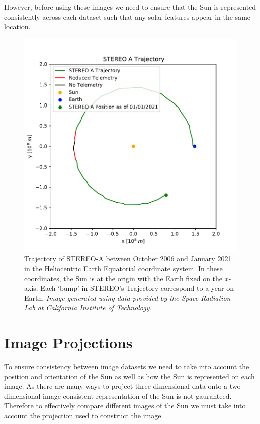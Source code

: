 \documentclass[11pt,a4paper,onecolumn]{report}
\begin{document}
However, before using these images we need to ensure that the Sun is represented
consistently across each dataset such that any solar features appear in the
same location.

\begin{figure}[ht]
  \centering
  \includegraphics[width = 0.7\linewidth]{STEREO_pos.pdf}
  \caption[STEREO-A Trajectory]{Trajectory of STEREO-A between October 2006 and January 2021 in the
  Heliocentric Earth Equatorial coordinate system. In these coordinates, the Sun
  is at the origin with the Earth fixed on the $x$-axis. Each `bump' in STEREO's
  Trajectory correspond to a year on Earth. \textit{Image generated using
  data provided by the Space Radiation Lab at California Institute of Technology.}}
  \label{fig:stereo_pos}
\end{figure}


\section{Image Projections}
\label{sec:proj}
To ensure consistency between image datasets we need to take into account the
position and orientation of the Sun as well as how the Sun is represented on
each image. As there are many ways to project three-dimensional data onto a
two-dimensional image consistent representation of the Sun is not gauranteed.
Therefore to effectively compare different images of the Sun we must take into
account the projection used to construct the image.
\end{document}
